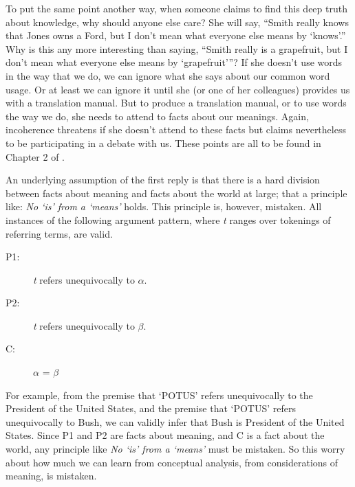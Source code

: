 To put the same point another way, when someone claims to find this deep truth about knowledge, why should anyone else care? She will say, ``Smith really knows that Jones owns a Ford, but I don't mean what everyone else means by `knows'.'' Why is this any more interesting than saying, ``Smith really is a grapefruit, but I don't mean what everyone else means by `grapefruit'''? If she doesn't use words in the way that we do, we can ignore what she says about our common word usage. Or at least we can ignore it until she (or one of her colleagues) provides us with a translation manual. But to produce a translation manual, or to use words the way we do, she needs to attend to facts about our meanings. Again, incoherence threatens if she doesn't attend to these facts but claims nevertheless to be participating in a debate with us. These points are all to be found in Chapter 2 of \citet{Jackson1998}.

An underlying assumption of the first reply is that there is a hard division between facts about meaning and facts about the world at large; that a principle like: \textit{No `is' from a `means'} holds. This principle is, however, mistaken. All instances of the following argument pattern, where \textit{t} ranges over tokenings of referring terms, are valid.

\begin{description}
\item[P1:] \textit{t} refers unequivocally to ${\alpha}$.
\item[P2:] \textit{t} refers unequivocally to ${\beta}$.
\item[C:] ${\alpha}$ = ${\beta}$
\end{description}

\noindent For example, from the premise that `POTUS' refers unequivocally to the President of the United States, and the premise that `POTUS' refers unequivocally to Bush, we can validly infer that Bush is President of the United States. Since P1 and P2 are facts about meaning, and C is a fact about the world, any principle like \textit{No `is' from a `means' }must be mistaken. So this worry about how much we can learn from conceptual analysis, from considerations of meaning, is mistaken.

